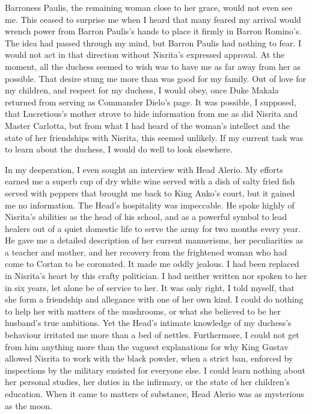 \documentclass{article}
\begin{document}
 Barroness Paulis, the remaining woman close to her grace, would not even see me. This ceased to surprise me when I heard that many feared my arrival would wrench power from Barron Paulis's hands to place it firmly in Barron Romino's. The idea had passed through my mind, but Barron Paulis had nothing to fear. I would not act in that direction without Nisrita's expressed approval. At the moment, all the duchess seemed to wish was to have me as far away from her as possible. That desire stung me more than was good for my family. Out of love for my children, and respect for my duchess, I would obey, once Duke Makala returned from serving as Commander Dielo's page. It was possible, I supposed, that Lucretious's mother strove to hide information from me as did Nisrita and Master Carlotta, but from what I had heard of the woman's intellect and the state of her friendships with Nisrita, this seemed unlikely. If my current task was to learn about the duchess, I would do well to look elsewhere. 

In my desperation, I even sought an interview with Head Alerio. My efforts earned me a superb cup of dry white wine served with a dish of salty fried fish served with peppers that brought me back to King Anko's court, but it gained me no information. The Head's hospitality was impeccable. He spoke highly of Nisrita's abilities as the head of his school, and as a powerful symbol to lead healers out of a quiet domestic life to serve the army for two months every year. He gave me a detailed description of her current mannerisms, her peculiarities as a teacher and mother, and her recovery from the frightened woman who had come to Cortan to be coronated. It made me oddly jealous. I had been replaced in Nisrita's heart by this crafty politician. I had neither written nor spoken to her in six years, let alone be of service to her. It was only right, I told myself, that she form a friendship and allegance with one of her own kind. I could do nothing to help her with matters of the mushrooms, or what she believed to be her husband's true ambitions. Yet the Head's intimate knowledge of my duchess's behaviour irritated me more than a bed of nettles. Furthermore, I could not get from him anything more than the vaguest explanations for why King Gustav allowed Nisrita to work with the black powder, when a strict ban, enforced by inspections by the military exsisted for everyone else. I could learn nothing about her personal studies, her duties in the infirmary, or the state of her children's education. When it came to matters of substance, Head Alerio was as mysterious as the moon. 
\end{document}
